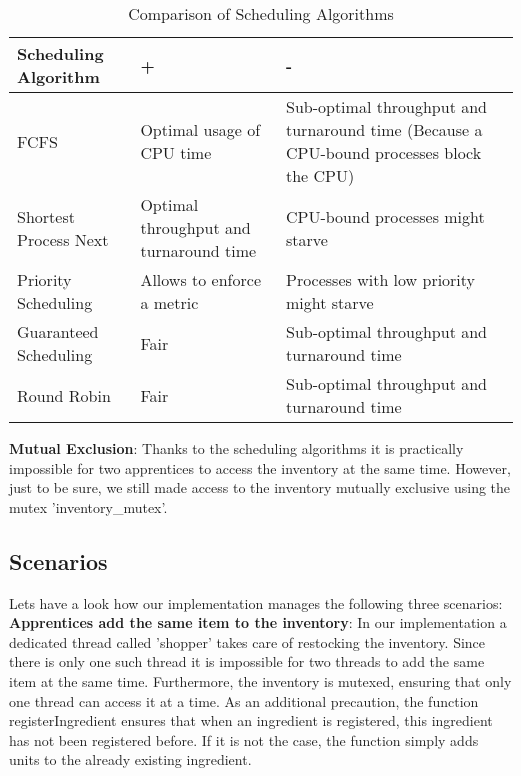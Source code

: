 \documentclass[11pt]{article}
\begin{document}
\begin{table}[htbp]
\caption{\label{fig:comparison}Comparison of Scheduling Algorithms}
\centering
\begin{tabular}{|p{5cm}|p{5cm}|p{6cm}|}
\hline
\textbf{Scheduling Algorithm} & \textbf{+} & \textbf{-}\\
\hline
FCFS & Optimal usage of CPU time & Sub-optimal throughput and turnaround time (Because a CPU-bound processes block the CPU)\\
\hline
Shortest Process Next & Optimal throughput and turnaround time & CPU-bound processes might starve\\
\hline
Priority Scheduling & Allows to enforce a metric & Processes with low priority might starve\\
\hline
Guaranteed Scheduling & Fair & Sub-optimal throughput and turnaround time\\
\hline
Round Robin & Fair & Sub-optimal throughput and turnaround time\\
\hline
\end{tabular}
\end{table}

\textbf{Mutual Exclusion}: Thanks to the scheduling algorithms it is practically impossible for two apprentices to access the inventory at the same time. However, just to be sure, we still made access to the inventory mutually exclusive using the mutex 'inventory\_mutex'.\\

\subsection{Scenarios}
\label{sec:orgb820eb1}

Lets have a look how our implementation manages the following three scenarios:\\

\textbf{Apprentices add the same item to the inventory}: In our implementation a dedicated thread called 'shopper' takes care of restocking the inventory. Since there is only one such thread it is impossible for two threads to add the same item at the same time. Furthermore, the inventory is mutexed, ensuring that only one thread can access it at a time. As an additional precaution, the function registerIngredient ensures that when an ingredient is registered, this ingredient has not been registered before. If it is not the case, the function simply adds units to the already existing ingredient.\\
\end{document}

